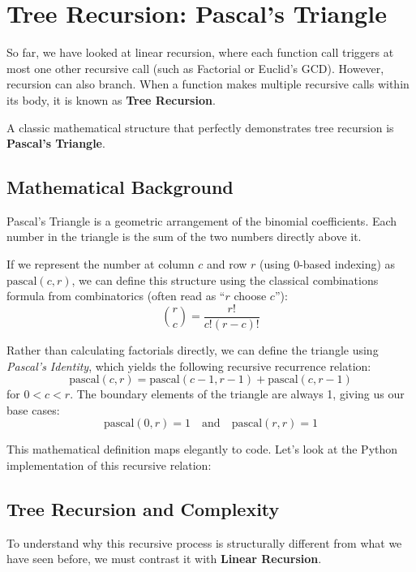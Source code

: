 \section{Tree Recursion: Pascal's Triangle}
\label{sec:pascal_triangle}

So far, we have looked at linear recursion, where each function call triggers at most one other recursive call (such as Factorial or Euclid's GCD). However, recursion can also branch. When a function makes multiple recursive calls within its body, it is known as \textbf{Tree Recursion}. 

A classic mathematical structure that perfectly demonstrates tree recursion is \textbf{Pascal's Triangle}.

\subsection{Mathematical Background}

Pascal's Triangle is a geometric arrangement of the binomial coefficients. Each number in the triangle is the sum of the two numbers directly above it. 

If we represent the number at column $c$ and row $r$ (using 0-based indexing) as $\text{pascal}(c, r)$, we can define this structure using the classical combinations formula from combinatorics (often read as ``$r$ choose $c$''):
\[
\binom{r}{c} = \frac{r!}{c!(r - c)!}
\]

Rather than calculating factorials directly, we can define the triangle using \textit{Pascal's Identity}, which yields the following recursive recurrence relation:
\[
\text{pascal}(c, r) = \text{pascal}(c - 1, r - 1) + \text{pascal}(c, r - 1)
\]
for $0 < c < r$. The boundary elements of the triangle are always 1, giving us our base cases:
\[
\text{pascal}(0, r) = 1 \quad \text{and} \quad \text{pascal}(r, r) = 1
\]

This mathematical definition maps elegantly to code. Let's look at the Python implementation of this recursive relation:



\subsection{Tree Recursion and Complexity}

To understand why this recursive process is structurally different from what we have seen before, we must contrast it with \textbf{Linear Recursion}. 

